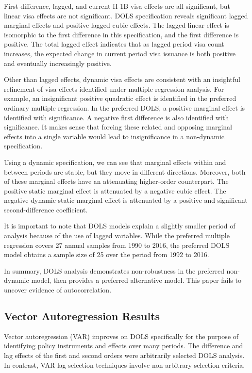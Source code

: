 \documentclass[review]{elsarticle}
\begin{document}
First-difference, lagged, and current H-1B visa effects are all significant, but linear visa effects are not significant.
DOLS specification reveals significant lagged marginal effects and positive lagged cubic effects.
The lagged linear effect is isomorphic to the first difference in this specification, and the first difference is positive.
The total lagged effect indicates that as lagged period visa count increases,
the expected change in current period visa issuance is both positive and eventually increasingly positive.

Other than lagged effects, dynamic visa effects are consistent with an insightful refinement of
visa effects identified under multiple regression analysis.
For example, an insignificant positive quadratic effect is identified in the preferred ordinary multiple regression.
In the preferred DOLS, a positive marginal effect is identified with significance.
A negative first difference is also identified with significance.
It makes sense that forcing these related and opposing marginal effects into a single variable would lead
to insignificance in a non-dynamic specification.

Using a dynamic specification, we can see that marginal effects within and between periods are stable,
but they move in different directions.
Moreover, both of these marginal effects have an attenuating higher-order counterpart.
The positive static marginal effect is attenuated by a negative cubic effect.
The negative dynamic static marginal effect is attenuated by a positive and significant second-difference coefficient.

It is important to note that DOLS models explain a slightly smaller period of analysis because of the use of lagged variables.
While the preferred multiple regression covers 27 annual samples from 1990 to 2016,
the preferred DOLS model obtains a sample size of 25 over the period from 1992 to 2016.

In summary, DOLS analysis demonstrates non-robustness in the preferred non-dynamic model,
then provides a preferred alternative model.
This paper fails to uncover evidence of autocorrelation.

\subsection{Vector Autoregression Results}
Vector autoregression (VAR) improves on DOLS specifically for the purpose
of identifying policy instruments and effects over many periods.
The difference and lag effects of the first and second orders were arbitrarily selected DOLS analysis.
In contrast, VAR lag selection techniques involve non-arbitrary selection criteria.
\end{document}
